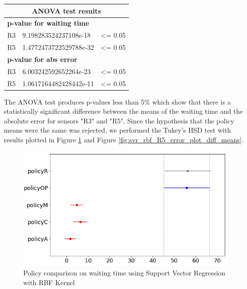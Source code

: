 \documentclass{mpaper}
\begin{document}
\begin{table}[h]
\centering
\begin{tabular}{|l|l|l|}
\hline
\multicolumn{3}{|c|}{\cellcolor[HTML]{DAE8FC}\textbf{ANOVA test results}}       \\ \hline
\multicolumn{3}{|l|}{\cellcolor[HTML]{FFFFFF}\textbf{p-value for waiting time}} \\ \hline
R3    & 9.198283524237108e-18     & \textless{}= 0.05                           \\ \hline
R5    & 1.4772473722529788e-32    & \textless{}= 0.05                           \\ \hline
\multicolumn{3}{|l|}{\cellcolor[HTML]{FFFFFF}\textbf{p-value for abs error}}    \\ \hline
R3    & 6.003242592652264e-23     & \textless{}= 0.05                           \\ \hline
R5    & 1.0617164482428442e-11    & \cellcolor[HTML]{FFFFFF}\textless{}= 0.05   \\ \hline
\end{tabular}
\end{table}

The ANOVA test produces p-values less than 5\% which show that there is a statistically significant difference between the means of the waiting time and the absolute error for sensors "R3" and "R5". Since the hypothesis that the policy means were the same was rejected, we performed the Tukey's HSD test with results plotted in Figure \ref{fig:svr_rbf_R5_waiting_plot_diff_means} and Figure \ref{fig:svr_rbf_R5_error_plot_diff_means}.

\begin{figure}[h]
    \centering
    \includegraphics[scale=0.35]{imgs/svr_rbf_R5_waiting_plot_diff_means.png}
    \caption{Policy comparison on waiting time using Support Vector Regression with RBF Kernel}
    \label{fig:svr_rbf_R5_waiting_plot_diff_means}
\end{figure}
\end{document}

